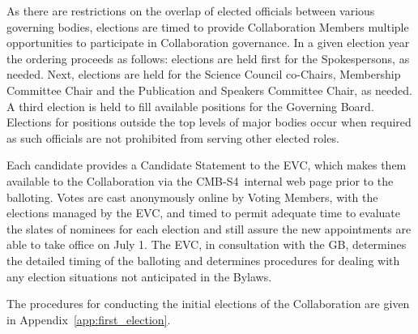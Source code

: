 \documentclass[12pt]{article}
\newcommand\collabname{CMB-S4}
\begin{document}
As there are restrictions on the overlap of elected officials between various governing bodies, elections are timed to provide Collaboration Members multiple opportunities to participate in Collaboration governance. 
In a given election year the ordering proceeds as follows: elections are held first for the Spokespersons\textcolor{\markcolor}{, as needed}. Next, elections are held for the Science Council co-Chairs, Membership Committee Chair and the Publication and Speakers Committee Chair, as needed.  A third election is held {\color{\markcolor} to fill available positions} for the Governing Board.
Elections for positions outside the top levels of major bodies occur when required as such officials are not prohibited from serving other elected roles. 

Each candidate provides a Candidate Statement to the EVC, which makes them available to the Collaboration via the \collabname\  internal web page prior to the balloting.   Votes are cast anonymously online by Voting Members, with the elections managed by the EVC, and timed to permit adequate time to evaluate the slates of nominees for each election and still assure the new appointments are able to take office on July 1.  The EVC, in consultation with the GB,  determines the detailed timing of the balloting and determines procedures for dealing with any election situations not anticipated in the Bylaws.

The procedures for conducting the initial elections of the Collaboration are given in Appendix~\ref{app:first_election}.





\end{document}
